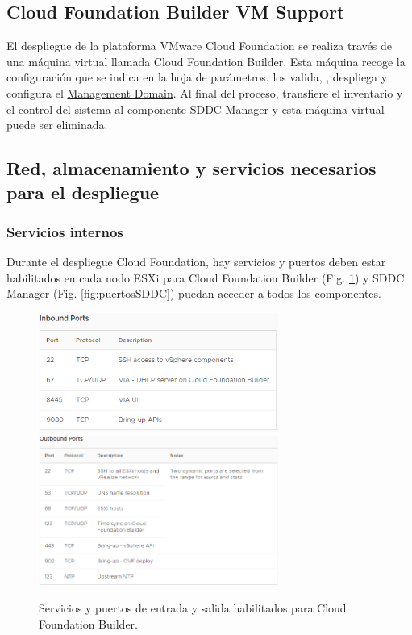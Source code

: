 \subsection{Cloud Foundation Builder VM Support}
\label{subsec:cloudBuilder}
El despliegue de la plataforma VMware Cloud Foundation se realiza través de una máquina virtual llamada Cloud Foundation Builder. Esta máquina recoge la configuración que se indica en la hoja de parámetros, los valida, , despliega y configura el \underline{Management Domain}. Al final del proceso, transfiere el inventario y el control del sistema al componente SDDC Manager y esta máquina virtual puede ser eliminada.\\

\subsection{Red, almacenamiento y servicios necesarios para el despliegue}

\subsubsection{Servicios internos}
\label{subsubsec:servInterno}
Durante el despliegue Cloud Foundation, hay servicios y puertos deben estar habilitados en cada nodo ESXi para Cloud Foundation Builder (Fig. \ref{fig:puertosCB}) y SDDC Manager (Fig. \ref{fig:puertosSDDC}) puedan acceder a todos los componentes.

\iffalse
\begin{figure}[h!]
  \centering
  \includegraphics[width=0.7\textwidth]{imaxes/conceptosPrevios/puertosentradaCB.png}
  \includegraphics[width=0.7\textwidth]{imaxes/conceptosPrevios/puertossalidaCB.png}
  \caption{Servicios y puertos de entrada y salida habilitados para Cloud Foundation Builder.}
  \label{fig:puertosCB}
\end{figure}

